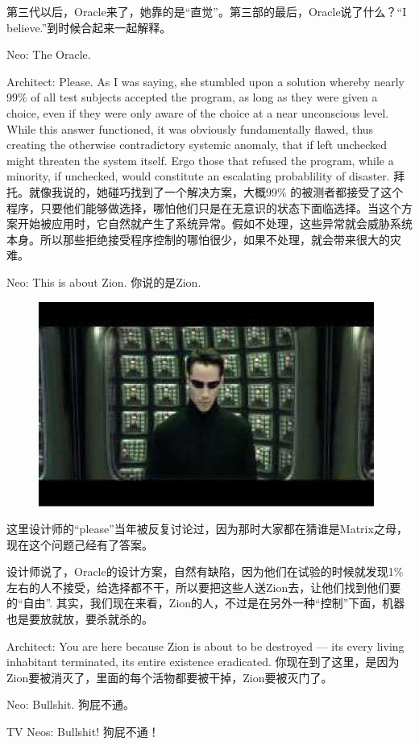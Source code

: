 \documentclass{ctexart}
\begin{document}
第三代以后，Oracle来了，她靠的是“直觉”。第三部的最后，Oracle说了什么？“I believe.”到时候合起来一起解释。

Neo: The Oracle.

Architect: Please. As I was saying, she stumbled upon a solution whereby nearly 99\% of all test subjects accepted the program, as long as they were given a choice, even if they were only aware of the choice at a near unconscious level. While this answer functioned, it was obviously fundamentally flawed, thus creating the otherwise contradictory systemic anomaly, that if left unchecked might threaten the system itself. Ergo those that refused the program, while a minority, if unchecked, would constitute an escalating probablility of disaster. 拜托。就像我说的，她碰巧找到了一个解决方案，大概99\% 的被测者都接受了这个程序，只要他们能够做选择，哪怕他们只是在无意识的状态下面临选择。当这个方案开始被应用时，它自然就产生了系统异常。假如不处理，这些异常就会威胁系统本身。所以那些拒绝接受程序控制的哪怕很少，如果不处理，就会带来很大的灾难。

Neo: This is about Zion. 你说的是Zion.

\begin{figure}[htb]
\centering
\includegraphics[width=0.5\linewidth]{fig/read_reloaded-163}
\end{figure}

这里设计师的“please”当年被反复讨论过，因为那时大家都在猜谁是Matrix之母，现在这个问题己经有了答案。

设计师说了，Oracle的设计方案，自然有缺陷，因为他们在试验的时候就发现1\% 左右的人不接受，给选择都不干，所以要把这些人送Zion去，让他们找到他们要的“自由”. 其实，我们现在来看，Zion的人，不过是在另外一种“控制”下面，机器也是要放就放，要杀就杀的。

Architect: You are here because Zion is about to be destroyed --- its every living inhabitant terminated, its entire existence eradicated. 你现在到了这里，是因为Zion要被消灭了，里面的每个活物都要被干掉，Zion要被灭门了。

Neo: Bullshit. 狗屁不通。

TV Neos: Bullshit! 狗屁不通！
\end{document}
